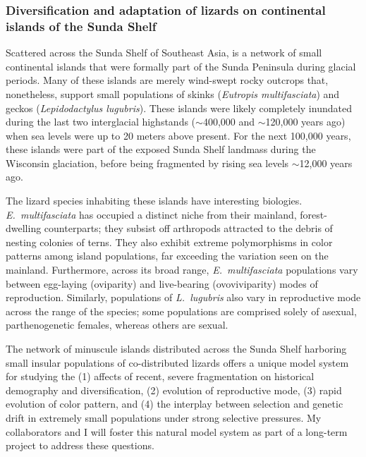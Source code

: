 \subsubsection*{Diversification and adaptation of lizards on continental islands
of the Sunda Shelf}
Scattered across the Sunda Shelf of Southeast Asia, is a network of small
continental islands that were formally part of the Sunda Peninsula during
glacial periods.
Many of these islands are merely wind-swept rocky outcrops that, nonetheless,
support small populations of skinks (\emph{Eutropis multifasciata}) and geckos
(\emph{Lepidodactylus lugubris}).
These islands were likely completely inundated during the last two
interglacial highstands ($\sim$400,000 and $\sim$120,000 years ago) when sea
levels were up to 20 meters above present.
For the next 100,000 years, these islands were part of the exposed Sunda Shelf
landmass during the Wisconsin glaciation, before being fragmented by rising sea
levels $\sim$12,000 years ago.

The lizard species inhabiting these islands have interesting biologies.
\emph{E.\ multifasciata} has occupied a distinct niche from their mainland,
forest-dwelling counterparts; they subsist off arthropods attracted to the
debris of nesting colonies of terns.
They also exhibit extreme polymorphisms in color patterns among island
populations, far exceeding the variation seen on the mainland.
Furthermore, across its broad range, \emph{E.\ multifasciata} populations vary
between egg-laying (oviparity) and live-bearing (ovoviviparity) modes of
reproduction.
Similarly, populations of \emph{L.\ lugubris} also vary in reproductive mode
across the range of the species; some populations are comprised solely of
asexual, parthenogenetic females, whereas others are sexual.

The network of minuscule islands distributed across the Sunda Shelf harboring
small insular populations of co-distributed lizards offers a unique model
system for studying the 
(1) affects of recent, severe fragmentation on historical demography and
diversification,
(2) evolution of reproductive mode,
(3) rapid evolution of color pattern, and 
(4) the interplay between selection and genetic drift in extremely small
populations under strong selective pressures.
My collaborators and I will foster this natural model system as part of a
long-term project to address these questions.

